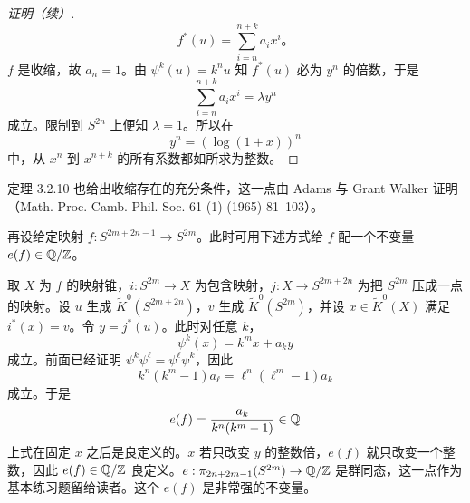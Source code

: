 
\begin{proof}[证明（续）]
\begin{equation*}
  f^*(u)=\sum_{i=n}^{n+k}a_ix^i\text{。}
\end{equation*}
$f$ 是收缩，故 $a_n=1$。由 $\psi^k(u)=k^nu$ 知 $f^*(u)$ 必为 $y^n$ 的倍数，于是
\begin{equation*}
  \sum_{i=n}^{n+k}a_ix^i=\lambda y^n
\end{equation*}
成立。限制到 $S^{2n}$ 上便知 $\lambda=1$。所以在
\begin{equation*}
  y^n=(\log(1+x))^n
\end{equation*}
中，从 $x^n$ 到 $x^{n+k}$ 的所有系数都如所求为整数。
\end{proof}

\begin{remark}{}
  定理 3.2.10 也给出收缩存在的充分条件，这一点由 Adams 与 Grant Walker 证明（Math. Proc. Camb. Phil. Soc. 61 (1) (1965) 81--103）。
\end{remark}

再设给定映射 $f: S^{2m+2n-1}\to S^{2m}$。此时可用下述方式给 $f$ 配一个不变量 $e(f)\in\mathbb{Q}/\mathbb{Z}$。

取 $X$ 为 $f$ 的映射锥，$i: S^{2m}\to X$ 为包含映射，$j: X\to S^{2m+2n}$ 为把 $S^{2m}$ 压成一点的映射。设 $u$ 生成 $\tilde K^0(S^{2m+2n})$，$v$ 生成 $\tilde K^0(S^{2m})$，并设 $x\in\tilde K^0(X)$ 满足 $i^*(x)=v$。令 $y=j^*(u)$。此时对任意 $k$，
\begin{equation*}
  \psi^k(x)=k^mx+a_ky
\end{equation*}
成立。前面已经证明 $\psi^k\psi^\ell=\psi^\ell\psi^k$，因此
\begin{equation*}
  k^n(k^m-1)a_\ell=\ell^n(\ell^m-1)a_k
\end{equation*}
成立。于是
\begin{equation*}
  e(f)=\frac{a_k}{k^n(k^m-1)}\in\mathbb{Q}
\end{equation*}
上式在固定 $x$ 之后是良定义的。$x$ 若只改变 $y$ 的整数倍，$e(f)$ 就只改变一个整数，因此 $e(f)\in\mathbb{Q}/\mathbb{Z}$ 良定义。$e:\pi_{2n+2m-1}(S^{2m})\to\mathbb{Q}/\mathbb{Z}$ 是群同态，这一点作为基本练习题留给读者。这个 $e(f)$ 是非常强的不变量。

